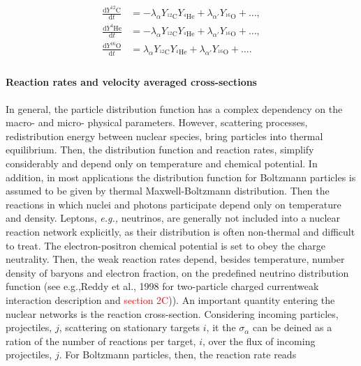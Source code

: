 \documentclass[11pt,a4paper,headinclude=true,DIV=14,BCOR=8mm,chapterprefix,listof=totoc,twoside,openright,abstracton]{scrbook}
\newcommand{\red}[1]{\textcolor{red}{#1}}
\begin{document}
\begin{eqnarray*}
    \frac{\text{d}Y^{12}\text{C}}{\text{d}t} &= -\lambda_{\alpha}Y_{^{12}\text{C}} Y_{^{4}\text{He}} + \lambda_{\alpha'}Y_{^{16}\text{O}} + \dots , \\
    \frac{\text{d}Y^{4}\text{He}}{\text{d}t} &= -\lambda_{\alpha}Y_{^{12}\text{C}} Y_{^{4}\text{He}} + \lambda_{\alpha'}Y_{^{16}\text{O}} + \dots , \\
    \frac{\text{d}Y^{16}\text{O}}{\text{d}t} &= \lambda_{\alpha}Y_{^{12}\text{C}} Y_{^{4}\text{He}} + \lambda_{\alpha'}Y_{^{16}\text{O}} + \dots . \\
\end{eqnarray*}

\paragraph{Reaction rates and velocity averaged cross-sections}

In general, the particle distribution function has a complex dependency on the macro- and micro- physical parameters. However, scattering processes, redistribution energy between nuclear species, bring particles into thermal equilibrium. Then, the distribution function and reaction rates, simplify considerably and depend only on temperature and chemical potential. 
In addition, in most applications the distribution function for Boltzmann particles is assumed to be given by thermal Maxwell-Boltzmann distribution. Then the reactions in which nuclei and photons participate depend only on temperature and density.
Leptons, \textit{e.g.,} neutrinos, are generally not included into a nuclear reaction network explicitly, as their distribution is often non-thermal and difficult to treat. The electron-positron chemical potential is set to obey the charge neutrality. Then, the weak reaction rates depend, besides temperature, number density of baryons and electron fraction, on the predefined neutrino distribution function (see e.g.,Reddy et al., 1998 for two-particle charged currentweak interaction description and \red{section 2C})). 
An important quantity entering the nuclear networks is the reaction cross-section. Considering incoming particles, projectiles, $j$, scattering on stationary targets $i$, it the $\sigma_{\alpha}$ can be deined as a ration of the number of reactions per target, $i$, over the flux of incoming projectiles, $j$. For Boltzmann particles, then, the reaction rate reads 
\end{document}

